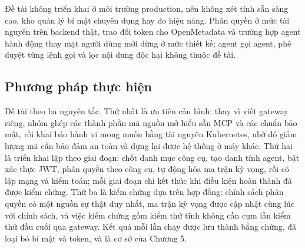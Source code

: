 Đề tài không triển khai ở môi trường production, nên không xét tính sẵn sàng cao, kho quản lý bí mật chuyên dụng hay đo hiệu năng. Phân quyền ở mức tài nguyên trên backend thật, trao đổi token cho OpenMetadata và trường hợp agent hành động thay mặt người dùng mới dừng ở mức thiết kế; agent gọi agent, phê duyệt từng lệnh gọi và lọc nội dung độc hại không thuộc đề tài.

\subsection{Phương pháp thực hiện}

Đề tài theo ba nguyên tắc. Thứ nhất là ưu tiên cấu hình: thay vì viết gateway riêng, nhóm ghép các thành phần mã nguồn mở hiểu sẵn MCP và các chuẩn bảo mật, rồi khai báo hành vi mong muốn bằng tài nguyên Kubernetes, nhờ đó giảm lượng mã cần bảo đảm an toàn và dựng lại được hệ thống ở máy khác. Thứ hai là triển khai lặp theo giai đoạn: chốt danh mục công cụ, tạo danh tính agent, bật xác thực JWT, phân quyền theo công cụ, tự động hóa ma trận kỳ vọng, rồi cô lập mạng và kiểm toán; mỗi giai đoạn chỉ kết thúc khi điều kiện hoàn thành đã được kiểm chứng. Thứ ba là kiểm chứng dựa trên hợp đồng: chính sách phân quyền có một nguồn sự thật duy nhất, ma trận kỳ vọng được cập nhật cùng lúc với chính sách, và việc kiểm chứng gồm kiểm thử tĩnh không cần cụm lẫn kiểm thử đầu cuối qua gateway. Kết quả mỗi lần chạy được lưu thành bằng chứng, đã loại bỏ bí mật và token, và là cơ sở của Chương 5.
